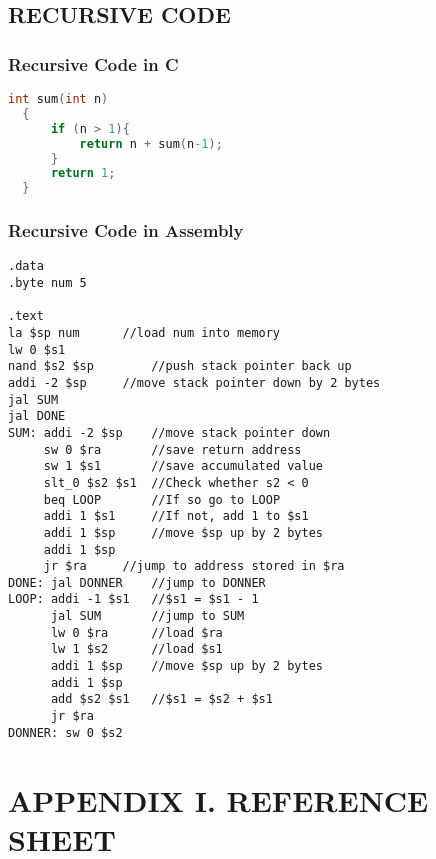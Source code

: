 \documentclass[11pt, titlepage]{article}
\begin{document}
\subsection{RECURSIVE CODE}
\subsubsection{Recursive Code in C}
\begin{lstlisting}[language = C]
int sum(int n)
  {
      if (n > 1){
          return n + sum(n-1);
      }
      return 1;
  }
\end{lstlisting}
\subsubsection{Recursive Code in Assembly}
\begin{lstlisting}[language=Ant]
.data
.byte num 5

.text
la $sp num		//load num into memory
lw 0 $s1		
nand $s2 $sp		//push stack pointer back up
addi -2 $sp		//move stack pointer down by 2 bytes
jal SUM
jal DONE
SUM: addi -2 $sp	//move stack pointer down
     sw 0 $ra		//save return address
     sw 1 $s1		//save accumulated value
     slt_0 $s2 $s1	//Check whether s2 < 0 
     beq LOOP		//If so go to LOOP
     addi 1 $s1		//If not, add 1 to $s1
     addi 1 $sp		//move $sp up by 2 bytes
     addi 1 $sp
     jr $ra		//jump to address stored in $ra
DONE: jal DONNER	//jump to DONNER
LOOP: addi -1 $s1	//$s1 = $s1 - 1
      jal SUM		//jump to SUM
      lw 0 $ra		//load $ra
      lw 1 $s2		//load $s1
      addi 1 $sp	//move $sp up by 2 bytes
      addi 1 $sp
      add $s2 $s1	//$s1 = $s2 + $s1
      jr $ra	
DONNER: sw 0 $s2

\end{lstlisting}
\nopagebreak
\section{APPENDIX I. REFERENCE SHEET}
\end{document}
